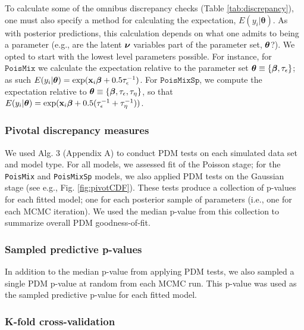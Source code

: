 \documentclass[12pt,english]{article}
\begin{document}
\begin{spacing}{1.9}
To calculate some of the omnibus discrepancy checks (Table
\ref{tab:discrepancy}), one must also specify a method for calculating
the expectation, $E(y_i|\boldsymbol{\theta})$.  As with posterior
predictions, this calculation depends on what one admits to being a
parameter (e.g., are the latent $\boldsymbol{\nu}$ variables part of the
parameter set, $\boldsymbol{\theta}$?).  We opted to start with the lowest level
parameters possible.  For instance, for $\texttt{PoisMix}$ we
calculate the expectation relative to the parameter set
$\boldsymbol{\theta} \equiv \{ \boldsymbol{\beta}, \tau_\epsilon \}$; as such
$E(y_i|\boldsymbol{\theta}) = \exp({\bf x}_i \boldsymbol{\beta} + 0.5
\tau_\epsilon^{-1})$.  For $\texttt{PoisMixSp}$, we compute the
expectation relative to
$\boldsymbol{\theta} \equiv \{ \boldsymbol{\beta}, \tau_\epsilon, \tau_\eta \}$, so that
$E(y_i|\boldsymbol{\theta}) = \exp({\bf x}_i \boldsymbol{\beta} + 0.5
(\tau_\epsilon^{-1} + \tau_\eta^{-1}))$.

\subsubsection{Pivotal discrepancy measures}

We used Alg. 3 (Appendix A) to conduct PDM tests on each simulated
data set and model type.  For all models, we assessed fit of the
Poisson stage; for the \texttt{PoisMix} and \texttt{PoisMixSp} models,
we also applied PDM tests on the Gaussian stage (see e.g.,
Fig. \ref{fig:pivotCDF}).  These tests produce a collection of
p-values for each fitted model; one for each posterior sample of
parameters (i.e., one for each MCMC iteration).  We used the median
p-value from this collection to summarize overall PDM goodness-of-fit.

\subsubsection{Sampled predictive p-values}

In addition to the median p-value from applying PDM tests, we also
sampled a single PDM p-value at random from each MCMC run.  This
p-value was used as the sampled predictive p-value for each fitted
model.

\subsubsection{K-fold cross-validation}


\end{spacing}
\end{document}

